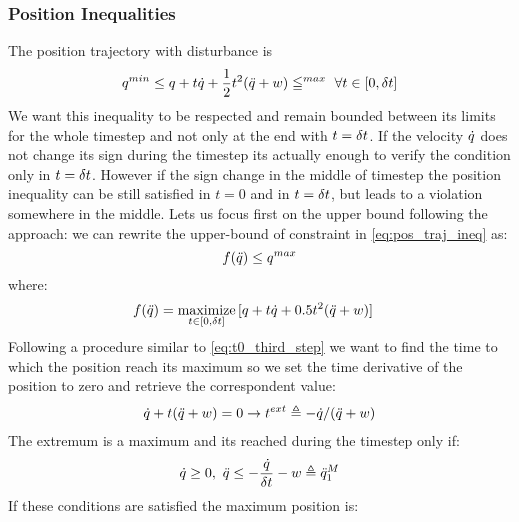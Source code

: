 \documentclass{article}
\begin{document}
\subsubsection*{Position Inequalities}
The position trajectory with disturbance is 
\begin{equation} \begin{aligned}
    q^{min} \leq q+t\dot{q}+ \frac{1}{2}t^2(\ddot{q}+w)\leqq^{max} \ \forall t\in[0,\delta t]
    \label{eq:pos_traj_ineq}
    \end{aligned}
\end{equation}
We want this inequality to be respected and remain bounded between its limits for the whole timestep and not only at the end with $t=\delta t$. If the velocity $\dot{q}$ does not change its sign during the timestep its actually enough to verify the condition only in $t=\delta t$. However if the sign change in the middle of timestep the position inequality can be still satisfied in $t=0$ and in $t=\delta t$, but leads to a violation somewhere in the middle. Lets us focus first on the upper bound following the \cite{DelPrete2018} approach: we can rewrite the upper-bound of constraint in \ref{eq:pos_traj_ineq} as:
\begin{equation}
    f(\ddot{q})\leq q^{max}
    \label{eq:func_costraint}
\end{equation}
where:
\begin{equation} \begin{aligned} 
    f(\ddot{q}) &= \operatorname*{maximize}_{t \in [0, \delta t]} \, [ q + t \dot{q} + 0.5 t^2 (\ddot{q} +w)]
    \end{aligned} 
\end{equation}
Following a procedure similar to \ref{eq:t0_third_step} we want to find the time to which the position reach its maximum so we set the time derivative of the position to zero and retrieve the correspondent value:
\begin{equation}
    \begin{aligned}
    \dot{q}+t(\ddot{q}+w)=0 \rightarrow t^{ext} \triangleq -\dot{q}/(\ddot{q}+w)
    \end{aligned}
\end{equation}
The extremum is a maximum and its reached during the timestep only if:
\begin{equation}
    \begin{aligned}
    \dot{q}\ge0, \ \ddot{q}\leq-\frac{\dot{q}}{\delta t}-w \triangleq \ddot{q}_1^{M}
    \end{aligned}
    \label{eq:position_timestep_condition}
\end{equation}
If these conditions are satisfied the maximum position is: 
\end{document}
